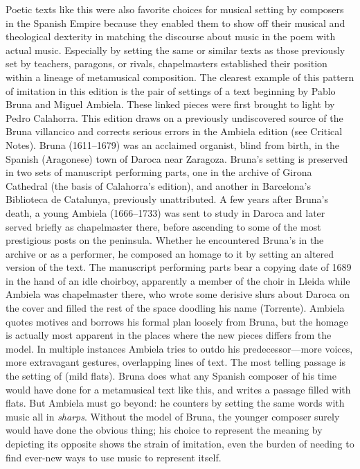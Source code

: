 Poetic texts like this were also favorite choices for musical setting by
composers in the Spanish Empire because they enabled them to show off their
musical and theological dexterity in matching the discourse about music in the
poem with actual music.
Especially by setting the same or similar texts as those previously set
by teachers, paragons, or rivals, chapelmasters established their position
within a lineage of metamusical composition.
The clearest example of this pattern of imitation in this edition is the pair
of settings of a text beginning  by Pablo
Bruna and Miguel Ambiela.
These linked pieces were first brought to light by Pedro Calahorra.%
    \Autocite{Calahorra:Suban}
This edition draws on a previously undiscovered source of the Bruna villancico
and corrects serious errors in the Ambiela edition (see Critical Notes).
Bruna (1611--1679) was an acclaimed organist, blind from birth, in the
Spanish (Aragonese) town of Daroca near Zaragoza.
Bruna's setting is preserved in two sets of manuscript performing parts, one
in the archive of Girona Cathedral (the basis of Calahorra's edition), and
another in Barcelona's Biblioteca de Catalunya, previously unattributed.
A few years after Bruna's death, a young Ambiela (1666--1733) was sent to
study in Daroca and later served briefly as chapelmaster there, before
ascending to some of the most prestigious posts on the peninsula.
Whether he encountered Bruna's  in the archive or as a
performer, he composed an homage to it by setting an altered version of the
text.
The manuscript performing parts bear a copying date of 1689 in the hand of an
idle choirboy, apparently a member of the choir in Lleida while Ambiela was
chapelmaster there, who wrote some derisive slurs about Daroca on the cover
and filled the rest of the space doodling his name (Torrente).
Ambiela quotes motives and borrows his formal plan loosely from Bruna, but the
homage is actually most apparent in the places where the new pieces differs
from the model.
In multiple instances Ambiela tries to outdo his predecessor---more voices,
more extravagant gestures, overlapping lines of text.
The most telling passage is the setting of  (mild
flats).
Bruna does what any Spanish composer of his time would have done for a
metamusical text like this, and writes a passage filled with flats.
But Ambiela must go beyond: he counters by setting the same words with music
all in \emph{sharps}. 
Without the model of Bruna, the younger composer surely would have done the
obvious thing; his choice to represent the meaning by depicting its opposite
shows the strain of imitation, even the burden of needing to find ever-new
ways to use music to represent itself.

